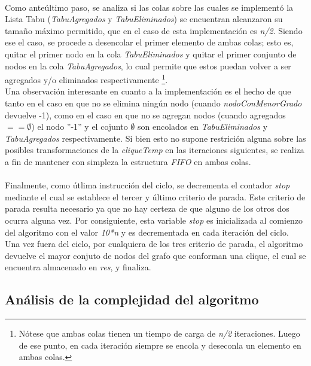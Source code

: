 \paragraph{}
Como anteúltimo paso, se analiza si las colas sobre las cuales se implementó la Lista Tabu (\textit{TabuAgregados} y \textit{TabuEliminados}) se encuentran alcanzaron su tamaño máximo permitido, que en el caso de esta implementación es \textit{n/2}. Siendo ese el caso, se procede a desencolar el primer elemento de ambas colas; esto es, quitar el primer nodo en la cola \textit{TabuEliminados} y quitar el primer conjunto de nodos en la cola \textit{TabuAgregados}, lo cual permite que estos puedan volver a ser agregados y/o eliminados respectivamente \footnote{Nótese que ambas colas tienen un tiempo de carga de \textit{n/2} iteraciones. Luego de ese punto, en cada iteración siempre se encola y deseconla un elemento en ambas colas.}.\\
Una observación interesante en cuanto a la implementación es el hecho de que tanto en el caso en que no se elimina ningún nodo (cuando \textit{nodoConMenorGrado} devuelve -1), como en el caso en que no se agregan nodos (cuando agregados $== \emptyset$) el nodo ''-1'' y el cojunto $\emptyset$ son encolados en \textit{TabuEliminados} y \textit{TabuAgregados} respectivamente. Si bien esto no supone restrición alguna sobre las posibles transformaciones de la \textit{cliqueTemp} en las iteraciones siguientes, se realiza a fin de mantener con simpleza la estructura \textit{FIFO} en ambas colas.

\paragraph{}
Finalmente, como útlima instrucción del ciclo, se decrementa el contador \textit{stop} mediante el cual se establece el tercer y último criterio de parada. Este criterio de parada resulta necesario ya que no hay certeza de que alguno de los otros dos ocurra alguna vez. Por consiguiente, esta variable \textit{stop} es inicializada al comienzo del algoritmo con el valor \textit{10*n} y es decrementada en cada iteración del ciclo. \\
Una vez fuera del ciclo, por cualquiera de los tres criterio de parada, el algoritmo devuelve el mayor conjuto de nodos del grafo que conforman una clique, el cual se encuentra almacenado en \textit{res}, y finaliza.

\subsection{Análisis de la complejidad del algoritmo}

